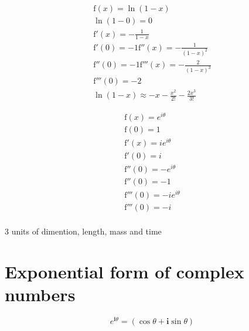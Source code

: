 \documentclass{article}
\begin{document}
\begin{gather}
	\mathrm{f}(x) = \ln (1 - x) \\
	\ln ( 1 - 0 ) = 0 \\
	\mathrm{f'}(x) = -\frac{1}{1-x}   \\
	\mathrm{f'}(0) = - 1
	\mathrm{f''}(x) = -\frac{1}{(1-x)^2} \\
	\mathrm{f''}(0) = - 1
	\mathrm{f'''}(x) = -\frac{2}{(1-x)^3} \\
	\mathrm{f'''}(0) = - 2 \\
	\ln ( 1 - x ) \approx -x - \frac{x^2}{2!} - \frac{2x^3}{3!}
\end{gather}

\begin{gather}
	\mathrm{f}(x) = e^{i\theta} \\
	\mathrm{f}(0) = 1 \\
	\mathrm{f'}(x) =  i e^{i\theta} \\
	\mathrm{f'}(0) =  i \\
	\mathrm{f''}(0) =  -e^{i\theta} \\
	\mathrm{f''}(0) =  -1 \\
	\mathrm{f'''}(0) =  -ie^{i\theta} \\
	\mathrm{f'''}(0) =  -i \\
\end{gather}

3 units of dimention, length, mass and time

\section{Exponential form of complex numbers}

\begin{equation}
	e^{\mathbf{i}\theta} = (\cos \theta + \mathbf{i} \sin \theta)
\end{equation}
\end{document}
